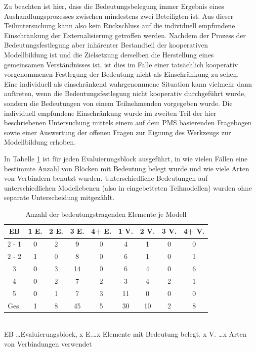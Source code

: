 Zu beachten ist hier, dass die Bedeutungsbelegung immer Ergebnis eines Aushandlungsprozesses zwischen mindestens zwei Beteiligten ist. Aus dieser Teiluntersuchung kann also kein Rückschluss auf die individuell empfundene Einschränkung der Externalisierung getroffen werden. Nachdem der Prozess der Bedeutungsfestlegung aber inhärenter Bestandteil der kooperativen Modellbildung ist und die Zielsetzung derselben die Herstellung eines gemeinsamen Verständnisses ist, ist dies im Falle einer tatsächlich kooperativ vorgenommenen Festlegung der Bedeutung nicht als Einschränkung zu sehen. Eine individuell als einschränkend wahrgenommene Situation kann vielmehr dann auftreten, wenn die Bedeutungsfestlegung nicht kooperativ durchgeführt wurde, sondern die Bedeutungen von einem Teilnehmenden vorgegeben wurde. Die individuell empfundene Einschränkung wurde im zweiten Teil der hier beschriebenen Untersuchung mittels einem auf dem \gls{PMS} basierenden Fragebogen sowie einer Auswertung der offenen Fragen zur Eignung des Werkzeugs zur Modellbildung erhoben. 

In Tabelle \ref{tab:anzahl_bedeutungstragende_elemente} ist für jeden Evaluierungsblock ausgeführt, in wie vielen Fällen eine bestimmte Anzahl von Blöcken mit Bedeutung belegt wurde und wie viele Arten von Verbindern benutzt wurden. Unterschiedliche Bedeutungen auf unterschiedlichen Modellebenen (also in eingebetteten Teilmodellen) wurden ohne separate Unterscheidung mitgezählt.

\begin{table}[htbp]
	\centering
	\caption{Anzahl der bedeutungstragenden Elemente je Modell}
\begin{tabular}{| c || c | c | c | c || c | c | c | c |}
  \hline
   EB & 1 E. & 2 E. & 3 E. & 4+ E. & 1 V. & 2 V. & 3 V. & 4+ V. \\ \hline
   2 - 1 & 0 & 2 &  9 & 0 &  4 &  1 & 0 & 0 \\ 
   2 - 2 & 1 & 0 &  8 & 0 &  6 &  1 & 0 & 1 \\ 
   3     & 0 & 3 & 14 & 0 &  6 &  4 & 0 & 6 \\ 
   4     & 0 & 2 &  7 & 2 &  3 &  4 & 2 & 1 \\ 
   5     & 0 & 1 &  7 & 3 & 11 &  0 & 0 & 0 \\ \hline
   Ges.  & 1 & 8 & 45 & 5 & 30 & 10 & 2 & 8 \\ \hline
\end{tabular} \\
\footnotesize EB \ldots Evaluierungsblock, x E.\ldots x Elemente mit Bedeutung belegt, x V. \ldots x Arten von Verbindungen verwendet
	\label{tab:anzahl_bedeutungstragende_elemente}
\end{table}
 
